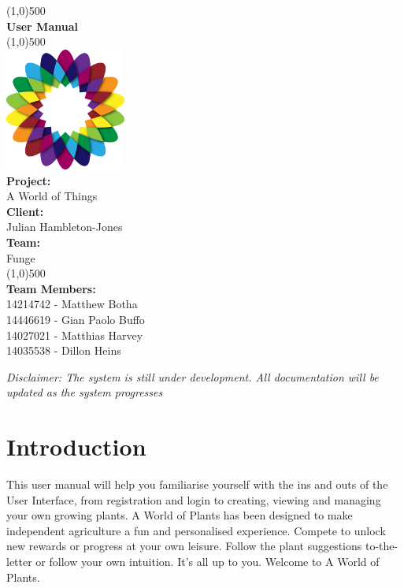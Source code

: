 \documentclass{article}
\begin{document}
\begin{titlepage}
	\begin{center}
		\line(1,0){500}\\
		[6mm]
		\huge{\bfseries User Manual}\\
		\line(1,0){500}\\
		[5mm]
		\includegraphics[width=150px]{../images/AWorldOfPlants.png}
		\\
		[5mm]
		\large\textbf{Project:}\\A World of Things\\
		[3mm]
		\large\textbf{Client:}\\Julian Hambleton-Jones\\
		[3mm]
		\large \textbf{Team:}\\Funge\\
		\line(1,0){500}\\
		[5mm]
		\large \textbf{Team Members:}\\
		[3mm]
		\large 14214742 - Matthew Botha\\
		\large 14446619 - Gian Paolo Buffo\\
		\large 14027021 - Matthias Harvey\\
        \large 14035538 - Dillon Heins\\[3mm]
	\end{center}
\end{titlepage}

\cleardoublepage
\thispagestyle{empty}
\tableofcontents

\cleardoublepage
\setcounter{page}{1}

\textit{Disclaimer: The system is still under development. All documentation will be updated as the system progresses}

\section{Introduction}
	This user manual will help you familiarise yourself with the ins and outs of the User Interface, from registration and login to creating, viewing and managing your own growing plants.
	A World of Plants has been designed to make independent agriculture a fun and personalised experience. Compete to unlock new rewards or progress at your own leisure. Follow the plant suggestions to-the-letter or follow your own intuition. It's all up to you.
	Welcome to A World of Plants. 
\end{document}
